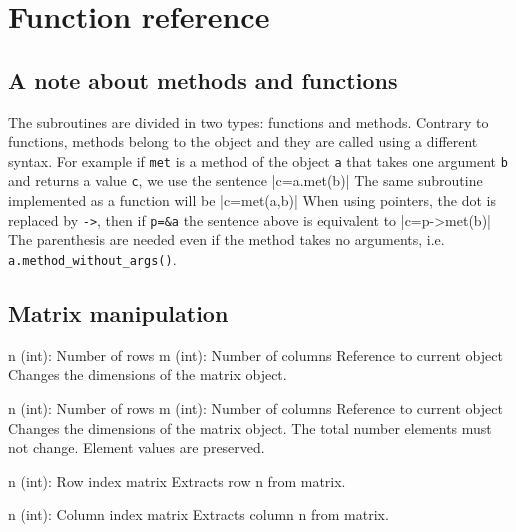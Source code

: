 \section{Function reference}


\subsection{A note about methods and functions}

The subroutines are divided in two types: functions and methods. Contrary to functions, methods belong
to the object and they are called using a different syntax. For example if {\tt met} is a method
of the object {\tt a} that takes one argument {\tt b} and returns a value {\tt c}, we use the sentence
|c=a.met(b)|
The same subroutine implemented as a function will be
|c=met(a,b)|
When using pointers, the dot is replaced by \verb|->|, then if \verb|p=&a| the sentence above
is equivalent to
|c=p->met(b)|
The parenthesis are needed even if the method takes no arguments, i.e. 
\verb|a.method_without_args()|.



\subsection{Matrix manipulation}

{n (int): Number of rows\newline
m (int): Number of columns}
{Reference to current object}
{Changes the dimensions of the matrix object.}

{n (int): Number of rows\newline
m (int): Number of columns}
{Reference to current object}
{Changes the dimensions of the matrix object. The total number elements must not change. Element
values are preserved.}



{n (int): Row index}
{matrix}
{Extracts row n from matrix.}

{n (int): Column index}
{matrix}
{Extracts column n from matrix.}

